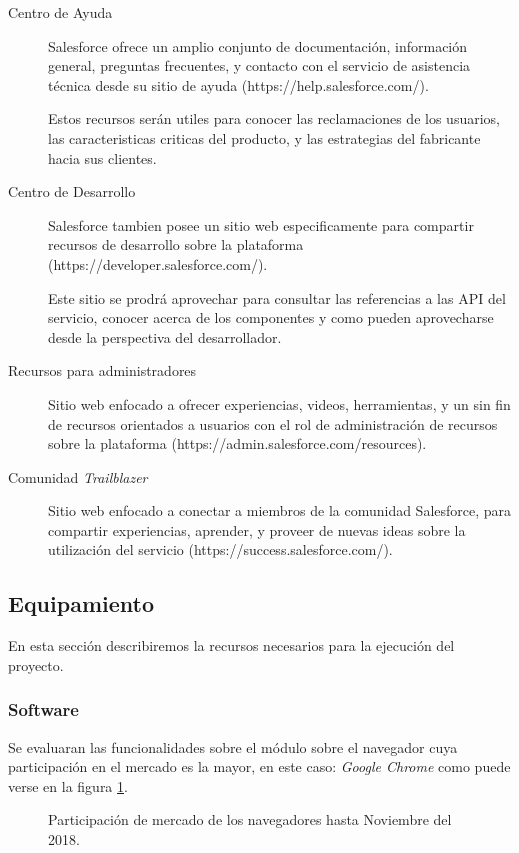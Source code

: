 \begin{description}
\item [Centro de Ayuda] Salesforce ofrece un amplio conjunto de documentación,
información general, preguntas frecuentes, y contacto con el servicio de
asistencia técnica desde su sitio de ayuda (https://help.salesforce.com/).

Estos recursos serán utiles para conocer las reclamaciones de los usuarios, las
caracteristicas criticas del producto, y las estrategias del fabricante hacia
sus clientes.

\item [Centro de Desarrollo] Salesforce tambien posee un sitio web
especificamente para compartir recursos de desarrollo sobre la plataforma
(https://developer.salesforce.com/).

Este sitio se prodrá aprovechar para consultar las referencias a las API del
servicio, conocer acerca de los componentes y como pueden aprovecharse desde la
perspectiva del desarrollador.

\item [Recursos para administradores] Sitio web enfocado a ofrecer experiencias,
videos, herramientas, y un sin fin de recursos orientados a usuarios con el rol
de administración de recursos sobre la plataforma
(https://admin.salesforce.com/resources).

\item [Comunidad \emph{Trailblazer}] Sitio web enfocado a conectar a miembros de
la comunidad Salesforce, para compartir experiencias, aprender, y proveer de
nuevas ideas sobre la utilización del servicio
(https://success.salesforce.com/).

\end{description}

\subsection{Equipamiento}
En esta sección describiremos la recursos necesarios para la ejecución del
proyecto.

\subsubsection{Software}
Se evaluaran las funcionalidades sobre el módulo sobre el navegador cuya
participación en el mercado es la mayor, en este caso: \emph{Google Chrome}
como puede verse en la figura \ref{software}.

\begin{figure}
\centering

\caption{Participación de mercado de los navegadores hasta Noviembre del 2018.}
\label{software}
\end{figure}

